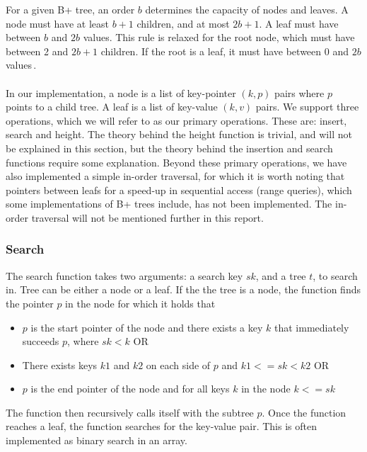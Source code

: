 For a given B+ tree, an order $b$ determines the capacity of nodes and leaves. A node must have at least $b+1$ children, and at most $2b+1$. A leaf must have between $b$ and $2b$ values. This rule is relaxed for the root node, which must have between 2 and $2b+1$ children. If the root is a leaf, it must have between 0 and $2b$ values\,\cite[p. 335]{ramakrishnan2003database}.

\paragraph{}
In our implementation, a node is a list of key-pointer $(k, p)$ pairs where $p$ points to a child tree. A leaf is a list of key-value $(k, v)$ pairs. We support three operations, which we will refer to as our primary operations. These are: insert, search and height. The theory behind the height function is trivial, and will not be explained in this section, but the theory behind the insertion and search functions require some explanation. Beyond these primary operations, we have also implemented a simple in-order traversal, for which it is worth noting that pointers between leafs for a speed-up in sequential access (range queries), which some implementations of B+ trees include, has not been implemented. The in-order traversal will not be mentioned further in this report. 

\subsubsection{Search}
\label{subsec:Search}
The search function takes two arguments: a search key $sk$, and a tree $t$, to search in. Tree can be either a node or a leaf. If the the tree is a node, the function finds the pointer $p$ in the node for which it holds that
\begin{itemize}
	\item $p$ is the start pointer of the node and there exists a key $k$ that immediately succeeds $p$, where $sk < k$ OR
	\item There exists keys $k1$ and $k2$ on each side of $p$ and $k1 <= sk < k2$ OR
	\item $p$ is the end pointer of the node and for all keys $k$ in the node $k <= sk$
\end{itemize}
The function then recursively calls itself with the subtree $p$. Once the function reaches a leaf, the function searches for the key-value pair. This is often implemented as binary search in an array. 

